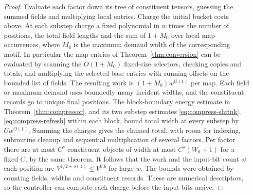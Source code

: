 \begin{proof}
Evaluate each factor down its tree of constituent tensors, guessing
the summed fields and multiplying local entries. Charge the initial
bucket costs above. At each substep charge a fixed polynomial in $w$
times the number of positions, the total field lengths and the sum
of $1+M_0$ over local map occurrences, where $M_0$ is the maximum
demand width of the corresponding motif. In particular the map entries
of Theorem~\ref{thm:conversion} can be evaluated by scanning the $O(1+M_0)$
fixed-size selectors, checking copies and totals, and multiplying
the selected base entries with running offsets on the bounded list of
fields. The resulting work is $(1+M_0)w^{O(1)}$ per map. Each field
or maximum demand uses boundedly many incident widths, and the
constituent records go to unique final positions. The block-boundary
energy estimate in Theorem~\ref{thm:compressor}, and its two substep estimates
\eqref{eq:compress-shrink}, \eqref{eq:compress-refresh} within each block, bound total width at every substep by
$Uw^{O(1)}$. Summing the charges gives the claimed total, with room
for indexing, subroutine cleanup and sequential multiplication of
several factors. Per factor there are at most $C^s$ constituent objects
of width at most $C^s(W_0+1)$ for a fixed $C$, by the same theorem.
It follows that the work and the input-bit count at each position are
$V^{1/2+o(1)}\le V^{0.6}$ for large $w$. The bounds were obtained by
counting fields, widths and constituent records. These are numerical
descriptors, so the controller can compute each charge before the input
bits arrive.
\end{proof}
